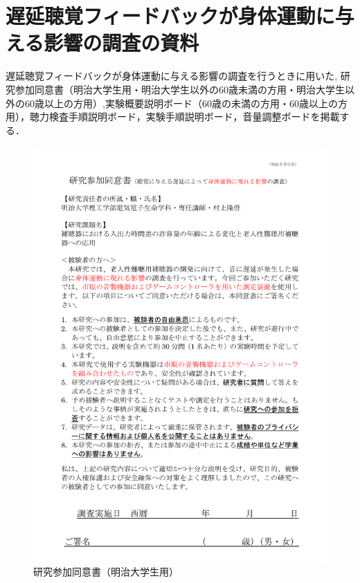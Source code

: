 \chapter{遅延聴覚フィードバックが身体運動に与える影響の調査の資料}
遅延聴覚フィードバックが身体運動に与える影響の調査を行うときに用いた,
研究参加同意書（明治大学生用・明治大学生以外の60歳未満の方用・明治大学生以外の60歳以上の方用）,実験概要説明ボード（60歳の未満の方用・60歳以上の方用），聴力検査手順説明ボード，実験手順説明ボード，音量調整ボードを掲載する．
\begin{figure}[ht]
	\centering
	\includegraphics[width=\textwidth]{furoku_A/douisyo_meiji.pdf} %
	\caption{研究参加同意書（明治大学生用）}
\end{figure}
